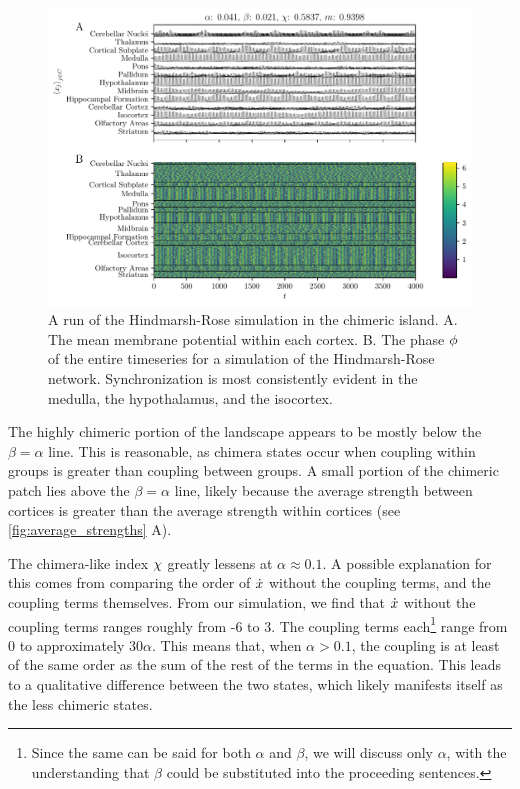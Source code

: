 \begin{figure}[ht]
  \centering
  \includegraphics[width=\textwidth]{figure/0_041-0_021_200dpi.pdf}
  \caption[Highly chimeric simulation]{A run of the Hindmarsh-Rose simulation in the chimeric island.
    A. The mean membrane potential within each cortex.
    B. The phase $\phi$ of the entire timeseries for a simulation of the Hindmarsh-Rose network.
    Synchronization is most consistently evident in the medulla, the hypothalamus, and the isocortex.
  }
  \label{fig:041_021}
\end{figure}

The highly chimeric portion of the landscape appears to be mostly below the $\beta = \alpha$ line.
This is reasonable, as chimera states occur when coupling within groups is greater than coupling between groups.
A small portion of the chimeric patch lies above the $\beta = \alpha$ line, likely because the average strength between cortices is greater than the average strength within cortices (see \cref{fig:average_strengths} A).

The chimera-like index $\chi$ greatly lessens at $\alpha \approx 0.1$.
A possible explanation for this comes from comparing the order of $\dot{x}$ without the coupling terms, and the coupling terms themselves.
From our simulation, we find that $\dot{x}$ without the coupling terms ranges roughly from -6 to 3.
The coupling terms each\footnote{Since the same can be said for both $\alpha$ and $\beta$, we will discuss only $\alpha$, with the understanding that $\beta$ could be substituted into the proceeding sentences.}
range from 0 to approximately $30 \alpha$.
This means that, when $\alpha > 0.1$, the coupling is at least of the same order as the sum of the rest of the terms in the equation.
This leads to a qualitative difference between the two states, which likely manifests itself as the less chimeric states.

